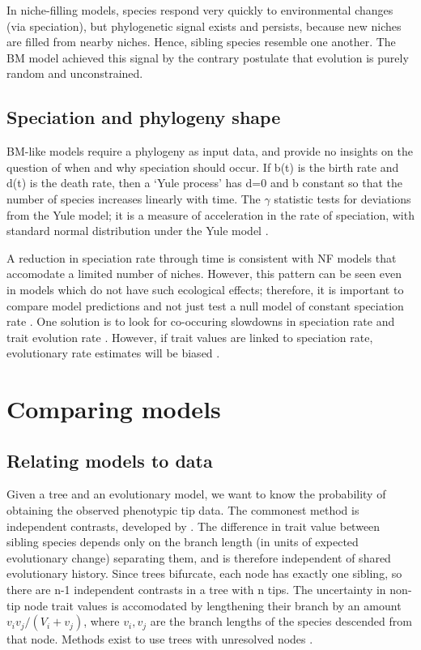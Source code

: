 \documentclass[12pt]{article}
\begin{document}
In niche-filling models, species respond very quickly to environmental changes (via speciation), but phylogenetic signal exists and persists, because new niches are filled from nearby niches. Hence, sibling species resemble one another. The BM model achieved this signal by the contrary postulate that evolution is purely random and unconstrained.

\subsection{Speciation and phylogeny shape}

BM-like models require a phylogeny as input data, and provide no insights on the question of when and why speciation should occur.
If b(t) is the birth rate and d(t) is the death rate, then a `Yule process' has d=0 and b constant so that the number of species increases linearly with time. The $\gamma$ statistic tests for deviations from the Yule model; it is a measure of acceleration in the rate of speciation, with standard normal distribution under the Yule model \citep{pybus_testing_2000}. 

A reduction in speciation rate through time is consistent with NF models that accomodate a limited number of niches. However, this pattern can be seen even in models which do not have such ecological effects; therefore, it is important to compare model predictions and not just test a null model of constant speciation rate \citep{rabosky_heritability_2009}. One solution is to look for co-occuring slowdowns in speciation rate and trait evolution rate \citep{harmon_early_2010}. However, if trait values are linked to speciation rate, evolutionary rate estimates will be biased \citep{pennell_integrative_2013}. 

\section{Comparing models}

\subsection{Relating models to data}

Given a tree and an evolutionary model, we want to know the probability of obtaining the observed phenotypic tip data. The commonest method is independent contrasts, developed by \citet{felsenstein_maximum-likelihood_1973,felsenstein_phylogenies_1985}. The difference in trait value between sibling species depends only on the branch length (in units of expected evolutionary change) separating them, and is therefore independent of shared evolutionary history. Since trees bifurcate, each node has exactly one sibling, so there are n-1 independent contrasts in a tree with n tips. The uncertainty in non-tip node trait values is accomodated by lengthening their branch by an amount $v_i v_j / (V_i + v_j)$, where $v_i, v_j$ are the branch lengths of the species descended from that node. Methods exist to use trees with unresolved nodes \citep{pagel_seeking_1993}.
\end{document}
